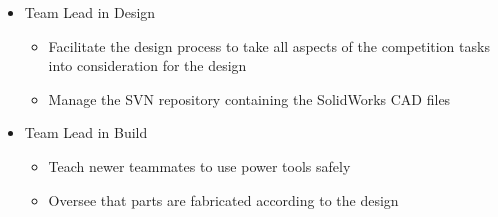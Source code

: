 \documentclass[]{friggeri-cv} %
\begin{document}
\begin{entrylist}
{\begin{itemize}
\begin{itemize}
					\item Create a system for teammates to use for statistics on other teams
					\item Organize the data using spreadsheets, TableAU, and in house built programs
					\item Create a "pick list" of robots to alliance with, based off quantitative and qualitative data, as well as the robots' compatibility with our own
				\end{itemize}
			\item Team Lead in Design
				\begin{itemize}
					\item Facilitate the design process to take all aspects of the competition tasks into consideration for the design
					\item Manage the SVN repository containing the SolidWorks CAD files
				\end{itemize}
			\item Team Lead in Build
				\begin{itemize}
					\item Teach newer teammates to use power tools safely
					\item Oversee that parts are fabricated according to the design
				\end{itemize}
		\end{itemize}
	}



\end{entrylist}
\end{document}
